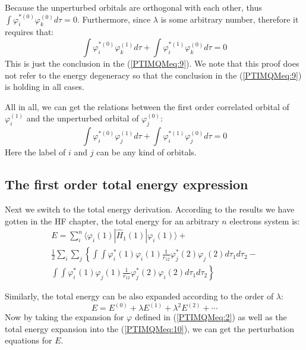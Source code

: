 Because the unperturbed orbitals are orthogonal with each other,
thus $\int\varphi^{*(0)}_{i}\varphi^{(0)}_{k} d\tau = 0$.
Furthermore, since $\lambda$ is some arbitrary number, therefore it
requires that:
\begin{equation}
\int \varphi^{*(0)}_{i}\varphi^{(1)}_{k} d\tau + \int
\varphi^{*(1)}_{i}\varphi^{(0)}_{k} d\tau = 0
\end{equation}
This is just the conclusion in the (\ref{PTIMQMeq:9}). We note that
this proof does not refer to the energy degeneracy so that the
conclusion in the (\ref{PTIMQMeq:9}) is holding in all cases.

All in all, we can get the relations between the first order
correlated orbital of $\varphi^{(1)}_{i}$ and the unperturbed
orbital of $\varphi^{(0)}_{j}$:
\begin{equation}\label{}
\int \varphi^{*(0)}_{i}\varphi^{(1)}_{j} d\tau + \int
\varphi^{*(1)}_{i}\varphi^{(0)}_{j} d\tau = 0
\end{equation}
Here the label of $i$ and $j$ can be any kind of orbitals.

\subsection{The first order total energy expression}
%
%
Next we switch to the total energy derivation. According to the
results we have gotten in the HF chapter, the total energy for an
arbitrary $n$ electrons system is:
\begin{multline}\label{PTIMQMeq:10}
E =
\sum_{i}^{n}\langle\varphi_{i}(1)|\hat{H}_{1}(1)|\varphi_{i}(1)\rangle
+
\\
\frac{1}{2}\sum_{i}\sum_{j} \left\{
\int\int\varphi^{*}_{i}(1)\varphi_{i}(1)\frac{1}{r_{12}}
\varphi^{*}_{j}(2)\varphi_{j}(2)d\tau_{1}d\tau_{2}- \right. \\
\left.
\int\int\varphi^{*}_{i}(1)\varphi_{j}(1)\frac{1}{r_{12}}
\varphi^{*}_{j}(2)\varphi_{i}(2)d\tau_{1}d\tau_{2} \right\}
\end{multline}

Similarly, the total energy can be also expanded according to the
order of $\lambda$:
\begin{equation}\label{}
E = E^{(0)} + \lambda E^{(1)} + \lambda^{2}E^{(2)} + \cdots
\end{equation}
Now by taking the expansion for $\varphi$ defined in
(\ref{PTIMQMeq:2}) as well as the total energy expansion into the
(\ref{PTIMQMeq:10}), we can get the perturbation equations for $E$.

